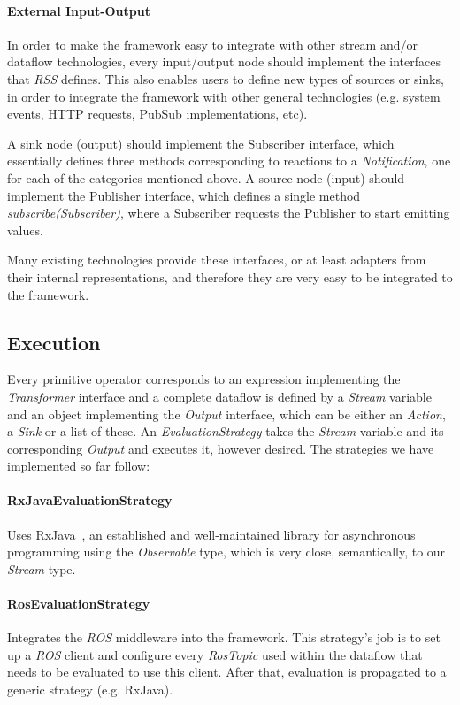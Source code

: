 \documentclass[sigplan,review,anonymous,screen]{acmart}
\begin{document}
\paragraph{External Input-Output}
In order to make the framework easy to integrate with other stream and/or
dataflow technologies, every input/output node should implement the
interfaces that \textit{RSS} defines. This also enables users to define new
types of sources or sinks, in order to integrate the framework with other
general technologies (e.g. system events, HTTP requests, PubSub implementations,
etc).

A sink node (output) should implement the Subscriber interface, which
essentially defines three methods corresponding to reactions to a
\textit{Notification}, one for each of the categories mentioned above.
%
A source node (input) should implement the Publisher interface, which defines a
single method \textit{subscribe(Subscriber)}, where a Subscriber requests the
Publisher to start emitting values.

Many existing technologies provide these interfaces, or at least adapters from
their internal representations, and therefore they are very easy to be
integrated to the framework.

\subsection{Execution}

Every primitive operator corresponds to an expression implementing the
\textit{Transformer} interface and a complete dataflow is defined by a
\textit{Stream} variable and an object implementing the \textit{Output} interface,
which can be either an \textit{Action}, a \textit{Sink} or a list of these.
An \textit{EvaluationStrategy} takes the \textit{Stream} variable and its
corresponding \textit{Output} and executes it, however desired.
The strategies we have implemented so far follow:

\paragraph{RxJavaEvaluationStrategy}
Uses RxJava~\cite{rxjava}, an established and well-maintained library for
asynchronous programming using the \textit{Observable} type, which is very close,
semantically, to our \textit{Stream} type.

\paragraph{RosEvaluationStrategy}
Integrates the \textit{ROS} middleware into the
framework. This strategy's job is to set up a \textit{ROS} client and configure every
\textit{RosTopic} used within the dataflow that needs to be evaluated to use
this client. After that, evaluation is propagated to a generic strategy (e.g.
RxJava).
\end{document}
